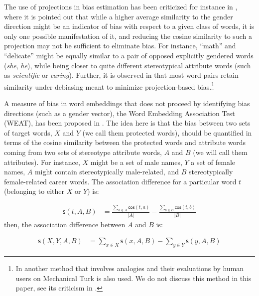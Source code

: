 \documentclass{clv3}
\begin{document}
The use of projections in bias estimation has been criticized for
instance in \citep{Gonen2019lipstick}, where it is pointed out that while a higher average
similarity to the gender direction might be an indicator of bias with
respect to a given class of words, it is only one possible manifestation
of it, and reducing the cosine similarity to such a projection may not
be sufficient to eliminate bias. For instance, ``math'' and ``delicate''
might be equally similar to a pair of opposed explicitly gendered words
(\emph{she}, \emph{he}), while being closer to quite different
stereotypical attribute words (such as \emph{scientific} or
\emph{caring}). Further, it is observed in \citep{Gonen2019lipstick} that most word pairs
retain similarity under debiasing meant to minimize projection-based
bias.\footnote{In \citep{Bolukbasi2016man} another method that involves analogies and
  their evaluations by human users on Mechanical Turk is also used. We
  do not discuss this method in this paper, see its criticism in
  \citep{Nissim2020fair}.}

A measure of bias in word embeddings that does not proceed by
identifying bias directions (such as a gender vector), the Word
Embedding Association Test (\textsf{WEAT}), has been proposed in
\citep{Caliskan2017semanticsBiases}. The idea here is that the bias between two sets of target
words, \(X\) and \(Y\) (we call them protected words), should be
quantified in terms of the cosine similarity between the protected words
and attribute words coming from two sets of stereotype attribute words,
\(A\) and \(B\) (we will call them attributes). For instance, \(X\)
might be a set of male names, \(Y\) a set of female names, \(A\) might
contain stereotypically male-related, and \(B\) stereotypically
female-related career words. The association difference for a particular
word \(t\) (belonging to either \(X\) or \(Y\)) is:

\vspace{-2mm}

\begin{align}
\label{eq:stAB}
\mathsf{s}(t,A,B) & = \frac{\sum_{a\in A}\mathsf{cos}(t,a)}{\vert A\vert} - \frac{\sum_{b\in B}\mathsf{cos}(t,b)}{\vert B\vert}
\end{align} \normalsize \noindent then, the association difference
between \(A\) and \(B\) is:

\begin{align}
\label{eq:sXYAB}
\mathsf{s}(X,Y,A,B) & = \sum_{x\in X} \mathsf{s}(x,A,B) -  \sum_{y\in Y} \mathsf{s}(y,A,B)
\end{align}
\end{document}
